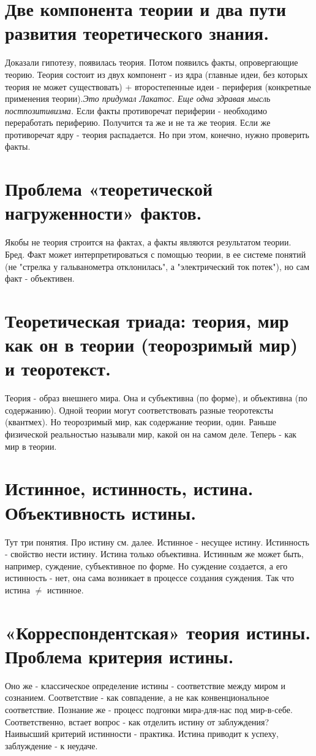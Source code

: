 \section{ Две компонента теории и два пути развития теоретического знания.}
Доказали гипотезу, появилась теория. Потом появилсь факты, опровергающие теорию. Теория состоит из двух компонент - из ядра (главные идеи, без которых теория не может существовать) + второстепенные идеи - периферия (конкретные применения теории).\textit{Это придумал Лакатос. Еще одна здравая мысль постпозитивизма.} Если факты противоречат периферии - необходимо переработать периферию. Получится та же и не та же теория. Если же противоречат ядру - теория распадается. Но при этом, конечно, нужно проверить факты.

\section{ Проблема «теоретической нагруженности» фактов.}
Якобы не теория строится на фактах, а факты являются результатом теории. Бред. Факт может интерпретироваться с помощью теории, в ее системе понятий (не "стрелка у гальванометра отклонилась", а "электрический ток потек"), но сам факт - объективен.

\section{ Теоретическая триада: теория, мир как он в теории (теорозримый мир) и теоротекст.}
Теория - образ внешнего мира. Она и субъективна (по форме), и объективна (по содержанию). Одной теории могут соответствовать разные теоротексты (квантмех). Но теорозримый мир, как содержание теории, один.
Раньше физической реальностью называли мир, какой он на самом деле. Теперь - как мир в теории.

\section{ Истинное, истинность, истина. Объективность истины.}
Тут три понятия. Про истину см. далее. Истинное - несущее истину. Истинность - свойство нести истину. Истина только объективна. Истинным же может быть, например, суждение, субъективное по форме. Но суждение создается, а его истинность - нет, она сама возникает в процессе создания суждения. Так что истина $\ne$ истинное.

\section{ «Корреспондентская» теория истины. Проблема критерия истины.}
Оно же - классическое определение истины - соответствие между миром и сознанием. Соответствие  - как совпадение, а не как конвенциональное соответствие. Познание же - процесс подгонки мира-для-нас под мир-в-себе. Соответственно, встает вопрос - как отделить истину от заблуждения? Наивысший критерий истинности - практика. Истина приводит к успеху, заблуждение - к неудаче.

